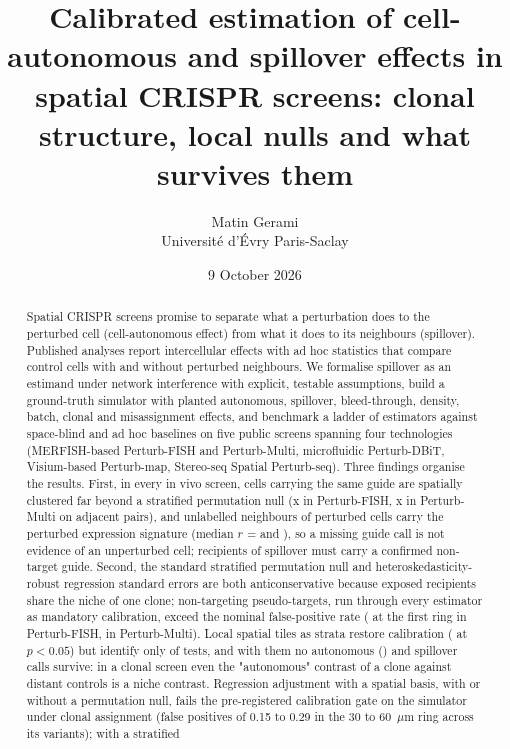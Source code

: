 \documentclass[11pt]{article}
\title{Calibrated estimation of cell-autonomous and spillover effects in spatial CRISPR screens: clonal structure, local nulls and what survives them}
\author{Matin Gerami\\ Universit\'e d'\'Evry Paris-Saclay}
\date{9 October 2026}
\begin{document}
\maketitle

\begin{abstract}
Spatial CRISPR screens promise to separate what a perturbation does to the perturbed cell
(cell-autonomous effect) from what it does to its neighbours (spillover). Published analyses
report intercellular effects with ad hoc statistics that compare control cells with and
without perturbed neighbours. We formalise spillover as an estimand under network
interference with explicit, testable assumptions, build a ground-truth simulator with planted
autonomous, spillover, bleed-through, density, batch, clonal and misassignment effects, and
benchmark a ladder of estimators against space-blind and ad hoc baselines on five public
screens spanning four technologies (MERFISH-based Perturb-FISH and Perturb-Multi, microfluidic
Perturb-DBiT, Visium-based Perturb-map, Stereo-seq Spatial Perturb-seq). Three findings
organise the results. First, in every in vivo screen, cells carrying the same guide are
spatially clustered far beyond a stratified permutation null (\FishClonRatio x in Perturb-FISH,
\MultiClonRatio x in Perturb-Multi on adjacent pairs), and unlabelled neighbours of perturbed
cells carry the perturbed expression signature (median $r$ = \FishMisCor{} and \MultiMisCor),
so a missing guide call is not evidence of an unperturbed cell; recipients of spillover must
carry a confirmed non-target guide. Second, the standard stratified permutation null and heteroskedasticity-robust regression
standard errors are both anticonservative because exposed recipients share the niche of one
clone; non-targeting pseudo-targets, run through every estimator as mandatory calibration,
exceed the nominal false-positive rate (\EOneGlobalNtcPRingZero{} at the first ring in Perturb-FISH,
\MultiEOneNtcP{} in Perturb-Multi). Local spatial tiles as strata restore calibration
(\EOneTileNtcP{} at $p<0.05$) but identify only \EOneTileNTests{} of \EOneGlobalNTests{} tests, and
with them no autonomous (\EOneTileAutoHits) and \EOneTileSpillHits{} spillover calls survive: in a
clonal screen even the "autonomous" contrast of a clone against distant controls is a niche
contrast. Regression adjustment with a spatial basis, with or without a permutation null,
fails the pre-registered calibration gate on the simulator under clonal assignment
(false positives of 0.15 to 0.29 in the 30 to 60~$\mu$m ring across its variants); with a stratified

\end{abstract}
\end{document}
